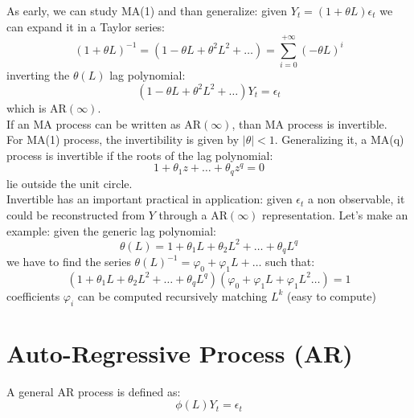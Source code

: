As early, we can study MA(1) and than generalize: given $Y_t = (1 + \theta L)\epsilon_t$ we can expand it in a Taylor series:
\[
(1 + \theta L)^{-1} = (1 - \theta L + \theta^2 L^2 + \ldots)= \sum_{i = 0}^{+ \infty} (-\theta L )^i
\]
inverting the $\theta(L)$ lag polynomial:
\[
(1 - \theta L + \theta^2 L^2 + \ldots)Y_t = \epsilon_t
\]
which is AR$(\infty)$.\\
If an MA process can be written as AR$(\infty)$, than MA process is invertible.\\
For MA(1) process, the invertibility is given by $|\theta| < 1$.
Generalizing it, a MA(q)  process is invertible if the roots of the lag polynomial:
\[
1 + \theta_1 z + \ldots + \theta_q z^q = 0
\]
lie outside the unit circle.\\
Invertible has an important practical in application: given $\epsilon_t$ a non observable, it could be reconstructed from $Y$ through a AR$(\infty)$ representation.
Let's make an example: given the generic lag polynomial:
\[
\theta(L) = 1 + \theta_1 L + \theta_2 L^2 + \ldots + \theta_qL^q
\]
we have to find the series $\theta(L)^{-1} = \varphi_0 + \varphi_1L + \ldots$ such that:
\[
(1 + \theta_1 L + \theta_2 L^2 + \ldots + \theta_qL^q)(\varphi_0 + \varphi_1L + \varphi_1L^2\ldots) = 1
\]
coefficients $\varphi_i$ can be computed recursively matching $L^k$ (easy to compute)
\section{Auto-Regressive Process (AR)}
A general AR process is defined as:
\begin{equation}
	\phi(L)Y_t = \epsilon_t
	\label{AR}
\end{equation}

